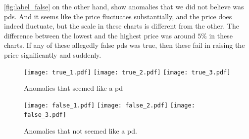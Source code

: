 \autoref{fig:label_false} on the other hand, show anomalies that we did not believe was \acp{pd}. And it seems like the price fluctuates substantially, and the price does indeed fluctuate, but the scale in these charts is different from the other. The difference between the lowest and the highest price was around $5\%$ in these charts. If any of these allegedly false \acp{pd} was true, then these fail in raising the price significantly and suddenly.

\begin{figure}
    \centering
    \texttt{[image: true\_1.pdf]}
    \texttt{[image: true\_2.pdf]}
    \texttt{[image: true\_3.pdf]}
    \caption{Anomalies that seemed like a \ac{pd}}
    \label{fig:label_true}
\end{figure}

\begin{figure}
    \centering
    \texttt{[image: false\_1.pdf]}
    \texttt{[image: false\_2.pdf]}
    \texttt{[image: false\_3.pdf]}
    \caption{Anomalies that not seemed like a \ac{pd}.}
    \label{fig:label_false}
\end{figure}
\fi

